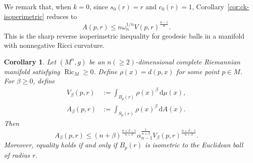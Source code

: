 \documentclass[11pt]{article}
\newtheorem{corollary}[theorem]{Corollary}
\newcommand{\Ric}{\operatorname{Ric}}
\newcommand{\dd}{\,\mathrm{d}}
\begin{document}
\noindent We remark that, when $k=0$, since $s_0(r)=r$ and $c_0(r)=1$, Corollary~\ref{cor:ck-isoperimetric} reduces to
\[
A(p,r)
\leq
n\omega_n^{1/n}
V(p,r)^{\frac{n-1}{n}}.
\]
This is the sharp reverse isoperimetric inequality for geodesic balls in a manifold with nonnegative Ricci curvature.




\begin{corollary} \label{cor:power-weight}
Let $(M^n,g)$ be an $n(\geq 2)$-dimensional complete Riemannian manifold satisfying $\Ric_M\geq0$. Define \(\rho(x)=d(p,x)\) for some point $p\in M$. For \(\beta\geq0\), define
\begin{align*}
V_\beta(p,r) &:= \int_{B_p(r)}\rho(x)^\beta\dd\mu(x), \\ 
A_\beta(p,r) &:= \int_{S_p(r)}\rho(x)^\beta\dd A(x). 
\end{align*}
Then
\[
A_\beta(p,r)
\leq
(n+\beta)^{\frac{n+\beta-1}{n+\beta}}
\alpha_{n-1}^{\frac{1}{n+\beta}}
V_\beta(p,r)^{\frac{n+\beta-1}{n+\beta}}.
\]
Moreover, equality holds if and only if $B_p(r)$ is isometric to the Euclidean ball of radius $r$.
\end{corollary}
\end{document}
